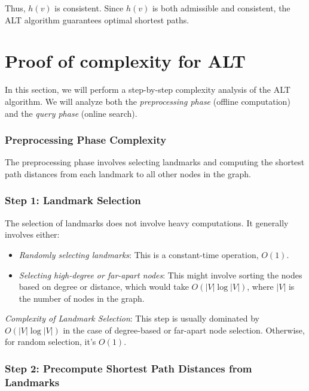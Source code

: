 \begin{appendices}
Thus, $ h(v) $ is consistent. Since $ h(v) $ is both admissible and consistent, the ALT algorithm guarantees optimal shortest paths.

	




\section{Proof of complexity for ALT}\label{appendix:ALT:complexity}

	In this section, we will perform a step-by-step complexity analysis of the ALT algorithm. We will analyze both the \textit{preprocessing phase} (offline computation) and the \textit{query phase} (online search).
	
	\subsubsection{Preprocessing Phase Complexity}
	
	The preprocessing phase involves selecting landmarks and computing the shortest path distances from each landmark to all other nodes in the graph.
	
	\subsubsection{Step 1: Landmark Selection}
	
	The selection of landmarks does not involve heavy computations. It generally involves either:
	\begin{itemize}
		\item \textit{Randomly selecting landmarks}: This is a constant-time operation, $ O(1) $.
		\item \textit{Selecting high-degree or far-apart nodes}: This might involve sorting the nodes based on degree or distance, which would take $ O(|V| \log |V|) $, where $ |V| $ is the number of nodes in the graph.
	\end{itemize}
	
	\textit{Complexity of Landmark Selection}:  
	This step is usually dominated by $ O(|V| \log |V|) $ in the case of degree-based or far-apart node selection. Otherwise, for random selection, it’s $ O(1) $.
	
	\subsubsection{Step 2: Precompute Shortest Path Distances from Landmarks}
	

\end{appendices}
